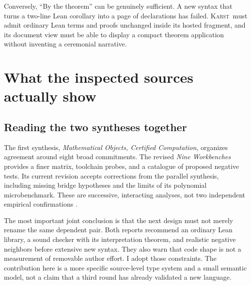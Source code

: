 \documentclass[11pt,letterpaper]{article}
\newcommand{\Karst}{\textsc{Karst}}
\theoremstyle{remark}
\begin{document}
Conversely, ``By the theorem'' can be genuinely sufficient. A new syntax that
turns a two-line Lean corollary into a page of declarations has failed.
\Karst\ must admit ordinary Lean terms and proofs unchanged inside its
hosted fragment, and its document view must be able to display a compact theorem
application without inventing a ceremonial narrative.

\section{What the inspected sources actually show}\label{sec:sources}

\subsection{Reading the two syntheses together}
The first synthesis, \emph{Mathematical Objects, Certified Computation},
organizes agreement around eight broad commitments. The revised
\emph{Nine Workbenches} provides a finer matrix, toolchain probes, and a
catalogue of proposed negative tests. Its current revision accepts corrections
from the parallel synthesis, including missing bridge hypotheses and the
limits of its polynomial microbenchmark. These are successive, interacting
analyses, not two independent empirical confirmations \cite{syn,workbenches}.

The most important joint conclusion is that the next design must not merely
rename the same dependent pair. Both reports recommend an ordinary Lean
library, a sound checker with its interpretation theorem, and realistic
negative neighbors before extensive new syntax. They also warn that code
shape is not a measurement of removable author effort. I adopt those
constraints. The contribution here is a more specific source-level type
system and a small semantic model, not a claim that a third round has already
validated a new language.
\end{document}
